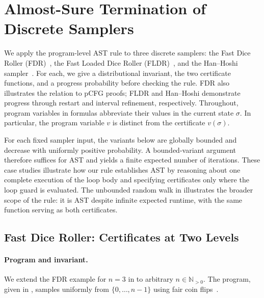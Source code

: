\section{Almost-Sure Termination of Discrete Samplers}
\label{sec:case-studies}

We apply the program-level AST rule to three discrete samplers:
the Fast Dice Roller (FDR)~\cite{DBLP:journals/corr/abs-1304-1916},
the Fast Loaded Dice Roller (FLDR)~\cite{DBLP:conf/aistats/SaadFRM20},
and the Han--Hoshi sampler~\cite{HanHoshi1997}. For each, we give a distributional invariant,
the two certificate functions, and a progress probability before
checking the rule. FDR also illustrates the relation to pCFG proofs;
FLDR and Han--Hoshi demonstrate progress through restart and interval
refinement, respectively. Throughout, program variables in formulas
abbreviate their values in the current state $\sigma$. In particular,
the program variable $v$ is distinct from the certificate $v(\sigma)$.

For each fixed sampler input, the variants below are globally bounded
and decrease with uniformly positive probability. A bounded-variant
argument therefore suffices for AST and yields a
finite expected number of iterations. These case studies illustrate how our rule establishes AST by
reasoning about one complete execution of the loop body and
specifying certificates only where the loop guard is evaluated. The unbounded random walk in
 illustrates the broader scope of the rule:
it is AST despite infinite expected runtime, with the same function
serving as both certificates.

\subsection{Fast Dice Roller: Certificates at Two Levels}
\label{sec:fdr}

\paragraph{Program and invariant.}
We extend the FDR example for $n=3$ in  to
arbitrary $n\in\mathbb N_{>0}$. The program, given in
, samples uniformly from $\{0,\ldots,n-1\}$
using fair coin flips~\cite{DBLP:journals/corr/abs-1304-1916}.


